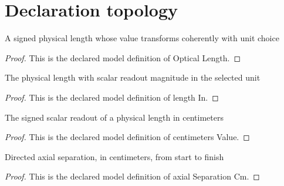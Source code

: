 \section{Declaration topology}
\begin{definition}
  \label{def:physics:phyx-mini-0034:phyxminiproblems-problemphyxmini0034-opticallength}
  A signed physical length whose value transforms coherently with unit choice
\end{definition}
\begin{proof}
  This is the declared model definition of Optical Length.
\end{proof}
\begin{definition}[length In]
  \label{def:physics:phyx-mini-0034:phyxminiproblems-problemphyxmini0034-lengthin}
  The physical length with scalar readout magnitude in the selected unit
\end{definition}
\begin{proof}
  This is the declared model definition of length In.
\end{proof}
\begin{definition}
  \label{def:physics:phyx-mini-0034:phyxminiproblems-problemphyxmini0034-centimetersvalue}
  The signed scalar readout of a physical length in centimeters
\end{definition}
\begin{proof}
  This is the declared model definition of centimeters Value.
\end{proof}
\begin{definition}
  \label{def:physics:phyx-mini-0034:phyxminiproblems-problemphyxmini0034-axialseparationcm}
  Directed axial separation, in centimeters, from start to finish
\end{definition}
\begin{proof}
  This is the declared model definition of axial Separation Cm.
\end{proof}
